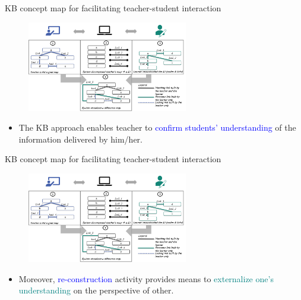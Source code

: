 \begin{frame}{KB concept map for facilitating teacher-student interaction}
    \begin{figure}[tb]
        \begin{center}
            \includegraphics[width=70mm]{images/kb_flow.png}
        \end{center}
    \end{figure}
    
    \begin{itemize}
        \item The KB approach enables teacher to \textcolor{blue}{confirm students' understanding}
        of the information delivered by him/her. 
    \end{itemize}
\end{frame}

\begin{frame}{KB concept map for facilitating teacher-student interaction}
    \begin{figure}[tb]
        \begin{center}
            \includegraphics[width=70mm]{images/kb_flow.png}
        \end{center}
    \end{figure}
    
    \begin{itemize}
        \item Moreover, \textcolor{blue}{re-construction} activity provides means to \textcolor{teal}{externalize 
        one's understanding} on the perspective of other.
    \end{itemize}
\end{frame}

    
